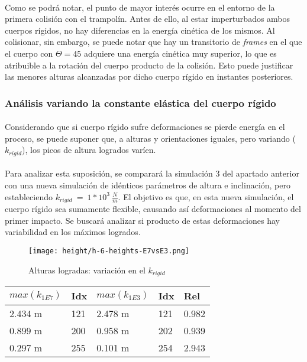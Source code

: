 \documentclass[12pt, twocolumn]{article}
\begin{document}
	\paragraph{} Como se podrá notar, el punto de mayor interés ocurre en el entorno de la primera colisión con el trampolín. Antes de ello, al estar imperturbados ambos cuerpos rígidos, no hay diferencias en la energía cinética de los mismos. Al colisionar, sin embargo, se puede notar que hay un transitorio de \textit{frames} en el que el cuerpo con $\Theta = 45$ adquiere una energía cinética muy superior, lo que es atribuible a la rotación del cuerpo producto de la colisión. Esto puede justificar las menores alturas alcanzadas por dicho cuerpo rígido en instantes posteriores. 
	
	\subsubsection{Análisis variando la constante elástica del cuerpo rígido}
	
	\paragraph{} Considerando que si cuerpo rígido sufre deformaciones se pierde energía en el proceso, se puede suponer que, a alturas y orientaciones iguales, pero variando ($k_{rigid}$), los picos de altura logrados varíen.
	
	\paragraph{} Para analizar esta suposición, se comparará la simulación $3$ del apartado anterior con una nueva simulación de idénticos parámetros de altura e inclinación, pero estableciendo $k_{rigid}\:=\:1*10^3\:\frac{N}{m}$. El objetivo es que, en esta nueva simulación, el cuerpo rígido sea sumamente flexible, causando así deformaciones al momento del primer impacto. Se buscará analizar si producto de estas deformaciones hay variabilidad en los máximos logrados. 
	
    \begin{figure}[H]
		\centering
		\texttt{[image: height/h-6-heights-E7vsE3.png]}
		\caption{Alturas logradas: variación en el $k_{rigid}$}
		\label{e7ve3}
	\end{figure}
	
	
    \begin{table}[H]
    \begin{tabular}{@{}lllll@{}}
    \toprule
    $max(k_{1E7})$ & Idx & $max(k_{1E3})$ & Idx & Rel   \\ \midrule
    2.434 m         & 121 & 2.478 m          & 121 & 0.982 \\
    0.899 m         & 200 & 0.958 m          & 202 & 0.939 \\
    0.297 m         & 255 & 0.101 m          & 254 & 2.943 \\ \bottomrule
    \end{tabular}
    \end{table}
	
\end{document}
